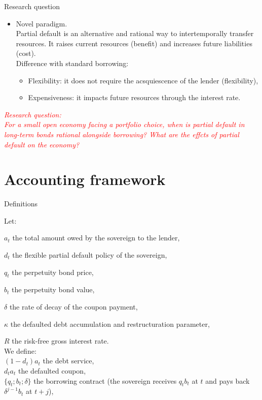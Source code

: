 \documentclass{beamer}
\begin{document}
\begin{frame}{Research question}

\begin{itemize}
\item Novel paradigm.
\\ \bigskip
Partial default is an alternative and rational way to intertemporally transfer resources. It raises current resources (benefit) and increases future liabilities (cost).
\\ \bigskip
Difference with standard borrowing:
\begin{itemize}
    \item Flexibility: it does not require the acsquiescence of the lender (flexibility),
    \item Expensiveness: it impacts future resources through the interest rate.
\end{itemize}
\end{itemize}
\bigskip

\textit{\textcolor{red}{Research question:}}\\
\textit{\textcolor{red}{For a small open economy facing a portfolio choice, when is partial default in long-term bonds rational alongside borrowing? What are the effcts of partial default on the economy?}}
\end{frame}



\section{Accounting framework}

\begin{frame}{Definitions}

Let:

\(a_t\) the total amount owed by the sovereign to the lender,

\(d_t\) the flexible partial default policy of the sovereign,

\(q_t\) the perpetuity bond price,

\(b_t\) the perpetuity bond value,

\(\delta\) the rate of decay of the coupon payment,

\(\kappa\) the defaulted debt accumulation and restructuration parameter,

\(R\) the risk-free gross interest rate.
\\ \bigbreak
We define:
\\ \smallbreak
\((1-d_t)a_t\) the debt service,
\\ \smallbreak
\(d_t a_t\) the defaulted coupon,
\\ \smallbreak
\(\{q_t;b_t;\delta\}\) the borrowing contract (the sovereign receives \(q_tb_t\) at \(t\) and pays back \(\delta^{j-1}b_t\) at \(t+j\)),


\end{frame}
\end{document}
